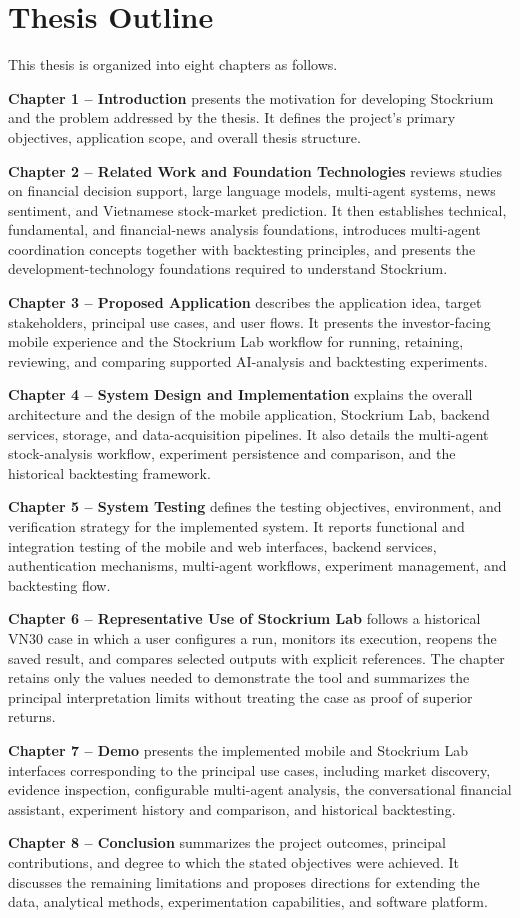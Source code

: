 \section{Thesis Outline}
\label{sec:thesis-outline}

This thesis is organized into eight chapters as follows.

\textbf{Chapter 1 -- Introduction} presents the motivation for developing Stockrium and the problem addressed by the thesis. It defines the project's primary objectives, application scope, and overall thesis structure.

\textbf{Chapter 2 -- Related Work and Foundation Technologies} reviews studies on financial decision support, large language models, multi-agent systems, news sentiment, and Vietnamese stock-market prediction. It then establishes technical, fundamental, and financial-news analysis foundations, introduces multi-agent coordination concepts together with backtesting principles, and presents the development-technology foundations required to understand Stockrium.

\textbf{Chapter 3 -- Proposed Application} describes the application idea, target stakeholders, principal use cases, and user flows. It presents the investor-facing mobile experience and the Stockrium Lab workflow for running, retaining, reviewing, and comparing supported AI-analysis and backtesting experiments.

\textbf{Chapter 4 -- System Design and Implementation} explains the overall architecture and the design of the mobile application, Stockrium Lab, backend services, storage, and data-acquisition pipelines. It also details the multi-agent stock-analysis workflow, experiment persistence and comparison, and the historical backtesting framework.

\textbf{Chapter 5 -- System Testing} defines the testing objectives, environment, and verification strategy for the implemented system. It reports functional and integration testing of the mobile and web interfaces, backend services, authentication mechanisms, multi-agent workflows, experiment management, and backtesting flow.

\textbf{Chapter 6 -- Representative Use of Stockrium Lab} follows a historical VN30 case in which a user configures a run, monitors its execution, reopens the saved result, and compares selected outputs with explicit references. The chapter retains only the values needed to demonstrate the tool and summarizes the principal interpretation limits without treating the case as proof of superior returns.

\textbf{Chapter 7 -- Demo} presents the implemented mobile and Stockrium Lab interfaces corresponding to the principal use cases, including market discovery, evidence inspection, configurable multi-agent analysis, the conversational financial assistant, experiment history and comparison, and historical backtesting.

\textbf{Chapter 8 -- Conclusion} summarizes the project outcomes, principal contributions, and degree to which the stated objectives were achieved. It discusses the remaining limitations and proposes directions for extending the data, analytical methods, experimentation capabilities, and software platform.
